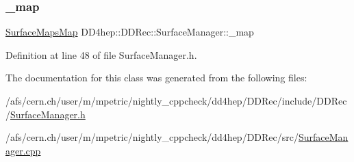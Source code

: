\subsubsection{\texorpdfstring{\+\_\+map}{\_map}}
{\footnotesize\ttfamily \hyperlink{class_d_d4hep_1_1_d_d_rec_1_1_surface_manager_af1cf671ee1a3a58ed722882a98970679}{Surface\+Maps\+Map} D\+D4hep\+::\+D\+D\+Rec\+::\+Surface\+Manager\+::\+\_\+map\hspace{0.3cm}{\ttfamily [protected]}}



Definition at line 48 of file Surface\+Manager.\+h.



The documentation for this class was generated from the following files\+:\begin{DoxyCompactItemize}
\item 
/afs/cern.\+ch/user/m/mpetric/nightly\+\_\+cppcheck/dd4hep/\+D\+D\+Rec/include/\+D\+D\+Rec/\hyperlink{_surface_manager_8h}{Surface\+Manager.\+h}\item 
/afs/cern.\+ch/user/m/mpetric/nightly\+\_\+cppcheck/dd4hep/\+D\+D\+Rec/src/\hyperlink{_surface_manager_8cpp}{Surface\+Manager.\+cpp}\end{DoxyCompactItemize}
